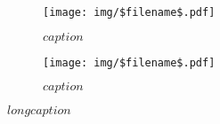 \begin{figure}
  \centering
  \begin{subfigure}[t]{0.42\textwidth}
    \texttt{[image: img/\$filename\$.pdf]}
    \caption{$caption$}
    \label{fig:$label$}
  \end{subfigure}
  \hspace{1cm} %
  \begin{subfigure}[t]{0.42\textwidth}
    \texttt{[image: img/\$filename\$.pdf]}
    \caption{$caption$}
    \label{fig:$label$}
  \end{subfigure}
  \caption[$short caption$]{$long caption$}
  \label{fig:$label$}
\end{figure}
